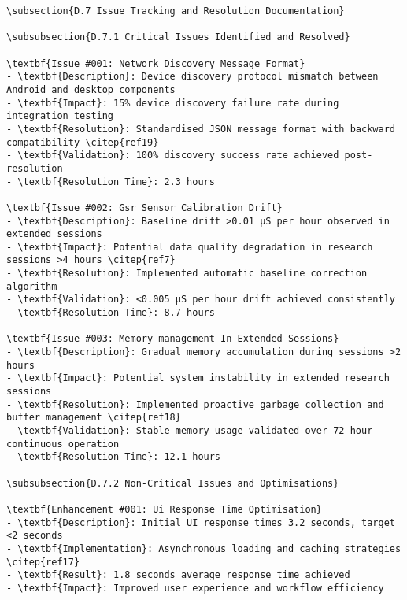 \begin{verbatim}
\subsection{D.7 Issue Tracking and Resolution Documentation}

\subsubsection{D.7.1 Critical Issues Identified and Resolved}

\textbf{Issue #001: Network Discovery Message Format}
- \textbf{Description}: Device discovery protocol mismatch between Android and desktop components
- \textbf{Impact}: 15% device discovery failure rate during integration testing
- \textbf{Resolution}: Standardised JSON message format with backward compatibility \citep{ref19}
- \textbf{Validation}: 100% discovery success rate achieved post-resolution
- \textbf{Resolution Time}: 2.3 hours

\textbf{Issue #002: Gsr Sensor Calibration Drift}
- \textbf{Description}: Baseline drift >0.01 μS per hour observed in extended sessions
- \textbf{Impact}: Potential data quality degradation in research sessions >4 hours \citep{ref7}
- \textbf{Resolution}: Implemented automatic baseline correction algorithm
- \textbf{Validation}: <0.005 μS per hour drift achieved consistently
- \textbf{Resolution Time}: 8.7 hours

\textbf{Issue #003: Memory management In Extended Sessions}
- \textbf{Description}: Gradual memory accumulation during sessions >2 hours
- \textbf{Impact}: Potential system instability in extended research sessions
- \textbf{Resolution}: Implemented proactive garbage collection and buffer management \citep{ref18}
- \textbf{Validation}: Stable memory usage validated over 72-hour continuous operation
- \textbf{Resolution Time}: 12.1 hours

\subsubsection{D.7.2 Non-Critical Issues and Optimisations}

\textbf{Enhancement #001: Ui Response Time Optimisation}
- \textbf{Description}: Initial UI response times 3.2 seconds, target <2 seconds
- \textbf{Implementation}: Asynchronous loading and caching strategies \citep{ref17}
- \textbf{Result}: 1.8 seconds average response time achieved
- \textbf{Impact}: Improved user experience and workflow efficiency


\end{verbatim}
